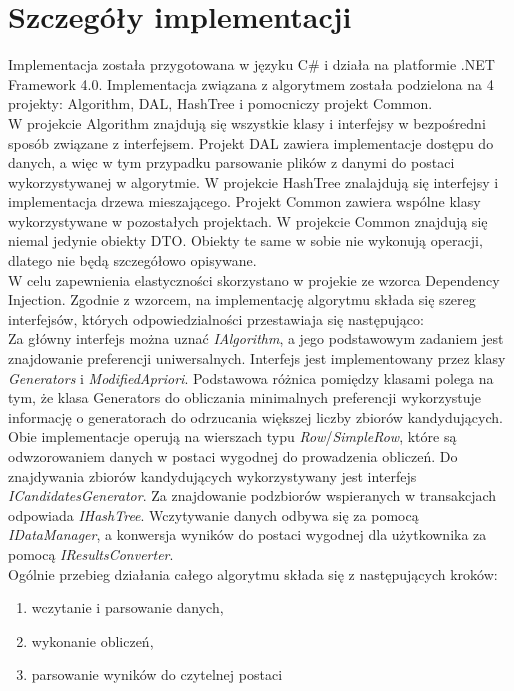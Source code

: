 \documentclass[a4paper,12pt]{article}
\begin{document}
\section{Szczegóły implementacji}

Implementacja została przygotowana w języku C\# i działa na platformie .NET Framework 4.0. Implementacja związana z algorytmem została podzielona na 4 projekty: Algorithm, DAL, HashTree i pomocniczy projekt Common.\\

W projekcie Algorithm znajdują się wszystkie klasy i interfejsy w bezpośredni sposób związane z interfejsem. Projekt DAL zawiera implementacje dostępu do danych, a więc w tym przypadku parsowanie plików z danymi do postaci wykorzystywanej w algorytmie. W projekcie HashTree znalajdują się interfejsy i implementacja drzewa mieszającego. Projekt Common zawiera wspólne klasy wykorzystywane w pozostałych projektach. W projekcie Common znajdują się niemal jedynie obiekty DTO. Obiekty te same w sobie nie wykonują operacji, dlatego nie będą szczegółowo opisywane.\\

W celu zapewnienia elastyczności skorzystano w projekie ze wzorca Dependency Injection. Zgodnie z wzorcem, na implementację algorytmu składa się szereg interfejsów, których odpowiedzialności przestawiaja się następująco:\\

Za główny interfejs można uznać \textit{IAlgorithm}, a jego podstawowym zadaniem jest znajdowanie preferencji uniwersalnych. Interfejs jest implementowany przez klasy \textit{Generators} i \textit{ModifiedApriori}. Podstawowa różnica pomiędzy klasami polega na tym, że klasa Generators do obliczania minimalnych preferencji wykorzystuje informację o generatorach do odrzucania większej liczby zbiorów kandydujących. Obie implementacje operują na wierszach
typu \textit{Row}/\textit{SimpleRow}, które są odwzorowaniem danych w postaci wygodnej do prowadzenia obliczeń. Do znajdywania zbiorów kandydujących wykorzystywany jest interfejs \textit{ICandidatesGenerator}. Za znajdowanie podzbiorów wspieranych w transakcjach odpowiada \textit{IHashTree}. Wczytywanie danych odbywa się za pomocą \textit{IDataManager}, a konwersja wyników do postaci wygodnej dla użytkownika za pomocą \textit{IResultsConverter}.\\

Ogólnie przebieg działania całego algorytmu składa się z następujących kroków:

\begin{enumerate}
\item wczytanie i parsowanie danych,
\item wykonanie obliczeń,
\item parsowanie wyników do czytelnej postaci
\end{enumerate}
\end{document}
